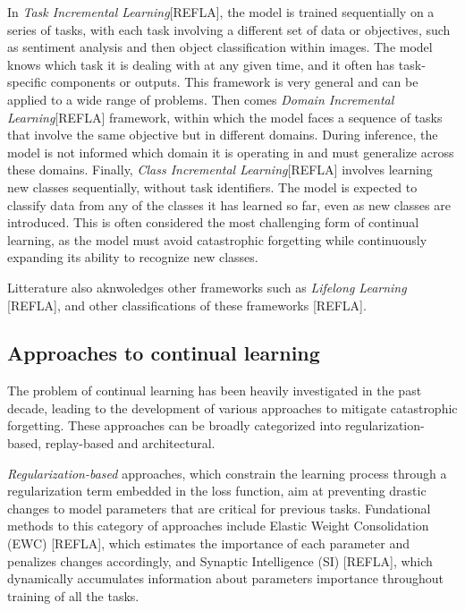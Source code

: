 \documentclass[twocolumn]{article}
\begin{document}
\vspace{2mm}
\noindent
In \textit{Task Incremental Learning}[REFLA], the model is trained sequentially on a series of tasks, with each task involving a different set of data or objectives, such as sentiment analysis and then object classification within images. The model knows which task it is dealing with at any given time, and it often has task-specific components or outputs. This framework is very general and can be applied to a wide range of problems. Then comes \textit{Domain Incremental Learning}[REFLA] framework, within which the model faces a sequence of tasks that involve the same objective but in different domains. During inference, the model is not informed which domain it is operating in and must generalize across these domains. Finally, \textit{Class Incremental Learning}[REFLA] involves learning new classes sequentially, without task identifiers. The model is expected to classify data from any of the classes it has learned so far, even as new classes are introduced. This is often considered the most challenging form of continual learning, as the model must avoid catastrophic forgetting while continuously expanding its ability to recognize new classes.

\vspace{2mm}
\noindent
Litterature also aknwoledges other frameworks such as \textit{Lifelong Learning} [REFLA], and other classifications of these frameworks [REFLA].


\subsection{Approaches to continual learning}


The problem of continual learning has been heavily investigated in the past decade, leading to the development of various approaches to mitigate catastrophic forgetting. These approaches can be broadly categorized into regularization-based, replay-based and architectural.

\vspace{2mm}
\noindent
\textit{Regularization-based} approaches, which constrain the learning process through a regularization term embedded in the loss function, aim at preventing drastic changes to model parameters that are critical for previous tasks. Fundational methods to this category of approaches include Elastic Weight Consolidation (EWC) [REFLA], which estimates the importance of each parameter and penalizes changes accordingly, and Synaptic Intelligence (SI) [REFLA], which dynamically accumulates information about parameters importance throughout training of all the tasks.
\end{document}
